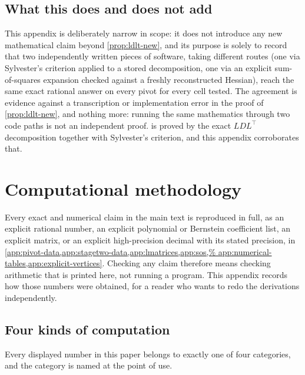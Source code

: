 \documentclass[11pt,reqno]{amsart}
\renewcommand{\_}{\origunderscore\allowbreak}
\numberwithin{equation}{section}
\theoremstyle{plain}
\theoremstyle{definition}
\theoremstyle{remark}
\begin{document}
\subsection{What this does and does not add}

This appendix is deliberately narrow in scope: it does not introduce
any new mathematical claim beyond \cref{prop:ldlt-new}, and its
purpose is solely to record that two independently written pieces of
software, taking different routes (one via Sylvester's criterion
applied to a stored decomposition, one via an explicit sum-of-squares
expansion checked against a freshly reconstructed Hessian), reach the
same exact rational answer on every pivot for every cell tested. The
agreement is evidence against a transcription or implementation error in
the proof of \cref{prop:ldlt-new}, and nothing more: running the same
mathematics through two code paths is not an independent proof.
 is proved by the exact $LDL^\top$ decomposition
together with Sylvester's criterion, and this appendix corroborates
that.
\section{Computational methodology}\label{app:code-index}

Every exact and numerical claim in the main text is reproduced in full,
as an explicit rational number, an explicit polynomial or Bernstein
coefficient list, an explicit matrix, or an explicit high-precision
decimal with its stated precision, in
\cref{app:pivot-data,app:stagetwo-data,app:lmatrices,app:sos,%
app:numerical-tables,app:explicit-vertices}. Checking any claim
therefore means checking arithmetic that is printed here, not running a
program. This appendix records how those numbers were obtained, for a
reader who wants to redo the derivations independently.

\subsection*{Four kinds of computation}

Every displayed number in this paper belongs to exactly one of four
categories, and the category is named at the point of use.
\end{document}
